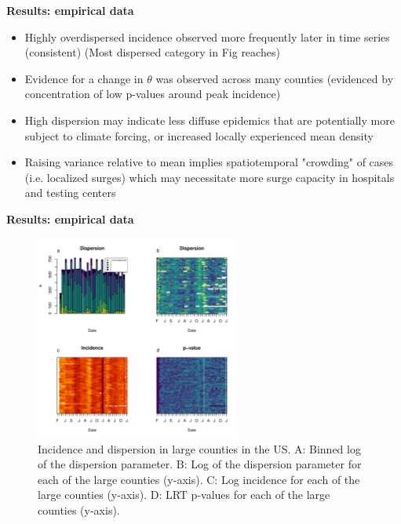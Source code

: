 \documentclass{beamer}
\begin{document}
\begin{frame}{\textbf{Results: empirical data}}
	\begin{itemize}[<+-| alert@+>]
		\item Highly overdispersed incidence observed more frequently later in time series (consistent) (Most dispersed category in Fig reaches) 
		\item Evidence for a change in \begin{math}\theta\end{math} was observed across many counties (evidenced by concentration of low p-values around peak incidence) 
		\item High dispersion may indicate less diffuse epidemics that are potentially more subject to climate forcing\cite{dalziel_urbanization_2018}, or increased locally experienced mean density \cite{lloyd_mean_1967}
            \item Raising variance relative to mean implies spatiotemporal "crowding" of cases (i.e. localized surges) which may necessitate more surge capacity in hospitals and testing centers

	\end{itemize}
\end{frame}

\begin{frame}{\textbf{Results: empirical data}}
	\begin{figure}[!h]
	\includegraphics[width=0.6\textwidth]{fig2}
	\caption{
		Incidence and dispersion in large counties in the US. A: Binned log of the dispersion parameter. B: Log of the dispersion parameter for each of the large counties (y-axis). C: Log incidence for each of the large counties (y-axis). D: LRT p-values for each of the large counties (y-axis).
	}
	\label{fig2}
\end{figure}
\end{frame}
\end{document}
